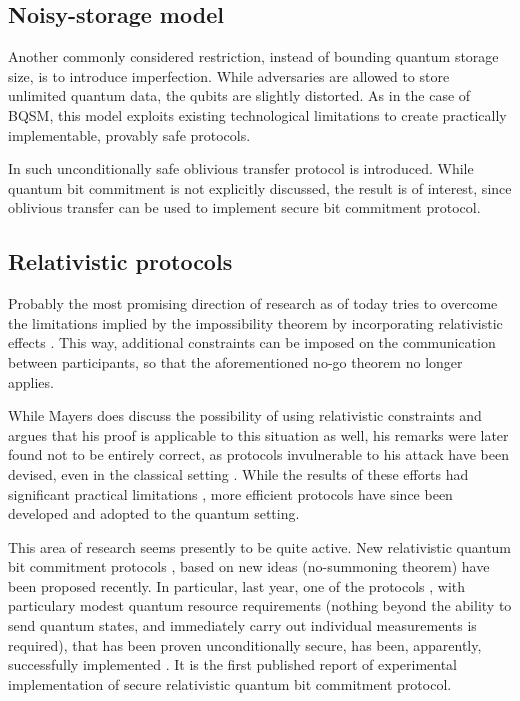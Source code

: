 \documentclass[10pt]{article}
\begin{document}
\subsection{Noisy-storage model}

Another commonly considered restriction, instead of bounding quantum storage size, is to introduce
imperfection. While adversaries are allowed to store unlimited quantum data, the qubits are slightly
distorted. As in the case of BQSM, this model exploits existing technological limitations to create
practically implementable, provably safe protocols.

In \cite{Wehner08} such unconditionally safe oblivious transfer protocol is introduced. While
quantum bit commitment is not explicitly discussed, the result is of interest, since oblivious
transfer can be used to implement secure bit commitment protocol.

\subsection{Relativistic protocols}

Probably the most promising direction of research as of today tries to overcome the limitations
implied by the impossibility theorem by incorporating relativistic effects \cite{Kent99}. This way,
additional constraints can be imposed on the communication between participants, so that the 
aforementioned no-go theorem no longer applies.

While Mayers \cite{Mayers97} does discuss the possibility of using relativistic constraints and argues 
that his proof is applicable to this situation as well, his remarks were later found not to be entirely
correct, as protocols invulnerable to his attack have been devised, even in the classical setting
\cite{Kent99}. While the results of these efforts had significant practical limitations \footnotemark,
more efficient protocols have since been developed \cite{Kent05} and adopted to the quantum setting.


This area of research seems presently to be quite active. New relativistic quantum bit commitment
protocols \cite{Kent11}, based on new ideas (no-summoning theorem\footnotemark \cite{Kent13}) 
have been proposed recently. In particular, last year, one of the protocols \cite{Kent12}, 
with particulary modest quantum resource requirements (nothing beyond the ability to send quantum
states, and immediately carry out individual measurements is required), that has been proven 
unconditionally secure, has been, apparently, successfully implemented \cite{Lunghi14}. It is the
first published report of experimental implementation of secure relativistic quantum bit commitment 
protocol.
\end{document}
